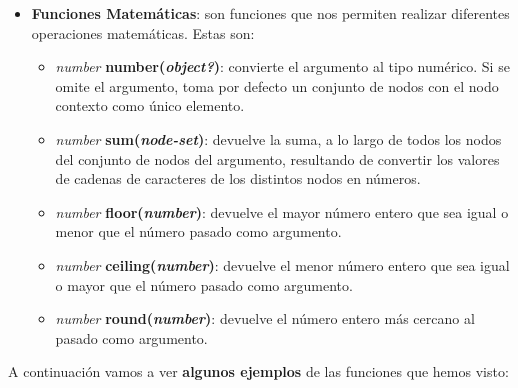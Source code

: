 \begin{itemize}
    \item \textbf{Funciones Matemáticas}: son funciones que nos permiten realizar diferentes operaciones matemáticas. Estas son:
    \begin{itemize}
        \item \textit{number} \textbf{number(\textit{object?})}: convierte el argumento al tipo numérico. Si se omite el argumento, toma por defecto un conjunto de nodos con el nodo contexto como único elemento.
        \item \textit{number} \textbf{sum(\textit{node-set})}: devuelve la suma, a lo largo de todos los nodos del conjunto de nodos del argumento, resultando de convertir los valores de cadenas de caracteres de los distintos nodos en números.
        \item \textit{number} \textbf{floor(\textit{number})}: devuelve el mayor número entero que sea igual o menor que el número pasado como argumento.
        \item \textit{number} \textbf{ceiling(\textit{number})}: devuelve el menor número entero que sea igual o mayor que el número pasado como argumento.
        \item \textit{number} \textbf{round(\textit{number})}: devuelve el número entero más cercano al pasado como argumento.
    \end{itemize}
\end{itemize}

A continuación vamos a ver \textbf{algunos ejemplos} de las funciones que hemos visto:

